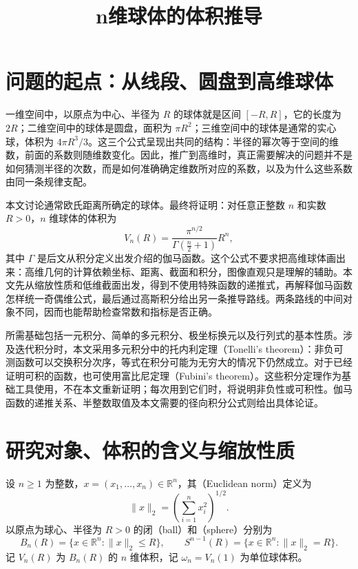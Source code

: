 \documentclass[UTF8]{ctexart}
\title{n维球体的体积推导}
\author{}
\date{}
\begin{document}
\maketitle
\tableofcontents

\section{问题的起点：从线段、圆盘到高维球体}
\label{sec:nb-introduction}

一维空间中，以原点为中心、半径为 $R$ 的球体就是区间 $[-R,R]$，它的长度为 $2R$；二维空间中的球体是圆盘，面积为 $\pi R^2$；三维空间中的球体是通常的实心球，体积为 $4\pi R^3/3$。这三个公式呈现出共同的结构：半径的幂次等于空间的维数，前面的系数则随维数变化。因此，推广到高维时，真正需要解决的问题并不是如何猜测半径的次数，而是如何准确确定维数所对应的系数，以及为什么这些系数由同一条规律支配。

本文讨论通常欧氏距离所确定的球体。最终将证明：对任意正整数 $n$ 和实数 $R>0$，$n$ 维球体的体积为
\begin{equation}\label{eq:nb-main-preview}
  V_n(R)=\frac{\pi^{n/2}}{\Gamma\!\left(\frac n2+1\right)}R^n,
\end{equation}
其中 $\Gamma$ 是后文从积分定义出发介绍的伽马函数。这个公式不要求把高维球体画出来：高维几何的计算依赖坐标、距离、截面和积分，图像直观只是理解的辅助。本文先从缩放性质和低维截面出发，得到不使用特殊函数的递推式，再解释伽马函数怎样统一奇偶维公式，最后通过高斯积分给出另一条推导路线。两条路线的中间对象不同，因而也能帮助检查常数和指标是否正确。

所需基础包括一元积分、简单的多元积分、极坐标换元以及行列式的基本性质。涉及迭代积分时，本文采用多元积分中的托内利定理（Tonelli's theorem）：非负可测函数可以交换积分次序，等式在积分可能为无穷大的情况下仍然成立。对于已经证明可积的函数，也可使用富比尼定理（Fubini's theorem）。这些积分定理作为基础工具使用，不在本文重新证明；每次用到它们时，将说明非负性或可积性。伽马函数的递推关系、半整数取值及本文需要的径向积分公式则给出具体论证。

\section{研究对象、体积的含义与缩放性质}
\label{sec:nb-definition}

\begin{definition}[欧氏球体与球面]
设 $n\geq1$ 为整数，$x=(x_1,\ldots,x_n)\in\mathbb R^n$，其（Euclidean norm）定义为
\[
  \|x\|_2=\left(\sum_{i=1}^n x_i^2\right)^{1/2}.
\]
以原点为球心、半径为 $R>0$ 的闭（ball）和（sphere）分别为
\[
  B_n(R)=\{x\in\mathbb R^n:\|x\|_2\leq R\},\qquad
  S^{n-1}(R)=\{x\in\mathbb R^n:\|x\|_2=R\}.
\]
记 $V_n(R)$ 为 $B_n(R)$ 的 $n$ 维体积，记 $\omega_n=V_n(1)$ 为单位球体积。
\end{definition}
\end{document}
